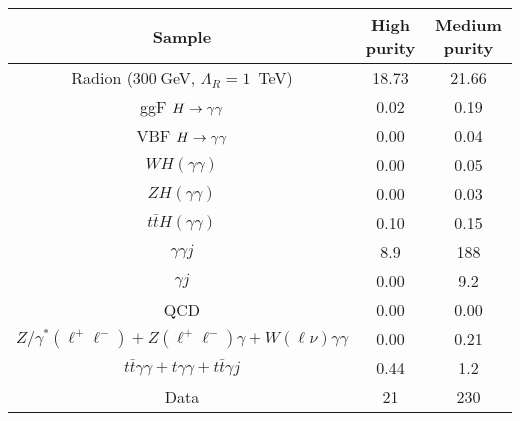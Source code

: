 \begin{tabular}{|c|c|c|}
\hline
Sample & High purity & Medium purity\\
\hline
Radion (300$~$GeV, $\Lambda_R = 1$~TeV)  & 18.73 & 21.66     \\
\hline
ggF $H\to\gamma\gamma$                &  0.02  &  0.19 \\
VBF $H\to\gamma\gamma$                &  0.00  &  0.04 \\
$WH(\gamma\gamma)$        &  0.00  &  0.05 \\
$ZH(\gamma\gamma)$        &  0.00  &  0.03 \\
$t\bar{t}H(\gamma\gamma)$ &  0.10  &  0.15 \\
\hline
$\gamma\gamma j$                      & 8.9  &  188  \\
$\gamma j$                            & 0.00 &  9.2  \\ 
QCD                                   & 0.00 &  0.00 \\ 
$Z/\gamma^*(\ell^+\ell^-) + Z(\ell^+\ell^-)\gamma + W(\ell\nu)\gamma\gamma$ & 0.00 &  0.21 \\
$t\bar{t}\gamma\gamma + t\gamma\gamma + t\bar{t}\gamma j$ & 0.44 &  1.2  \\
\hline
Data                                  & 21 & 230 \\
\hline
\end{tabular}
